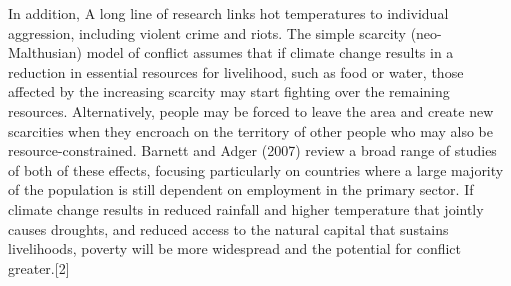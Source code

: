 \documentclass{mcmthesis}
\begin{document}
	In addition, A long line of research links hot temperatures to individual aggression, including violent crime and riots. The simple scarcity (neo-Malthusian) model of conflict assumes that if climate change results in a reduction in essential resources for livelihood, such as food or water, those affected by the increasing scarcity may start fighting over the remaining resources. Alternatively, people may be forced to leave the area and create new scarcities when they encroach on the territory of other people who may also be resource-constrained. Barnett and Adger (2007) review a broad range of studies of both of these effects, focusing particularly on countries where a large majority of the population is still dependent on employment in the primary sector. If climate change results in reduced rainfall and higher temperature that jointly causes droughts, and reduced access to the natural capital that sustains livelihoods, poverty will be more widespread and the potential for conflict greater.[2]
	
\end{document}
